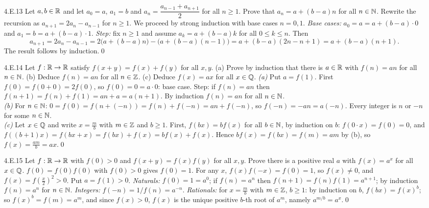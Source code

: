 \begin{bookex}[essential]{4.E.13}
Let $a,b\in\mathbb{R}$ and let $a_0=a$, $a_1=b$ and $a_n=\dfrac{a_{n-1}+a_{n+1}}2$ for all $n\ge1$. Prove that $a_n=a+(b-a)n$ for all $n\in\mathbb{N}$.
\solution
Rewrite the recursion as $a_{n+1}=2a_n-a_{n-1}$ for $n\ge1$. We proceed by strong induction with base cases $n=0,1$. \emph{Base cases:} $a_0=a=a+(b-a)\cdot0$ and $a_1=b=a+(b-a)\cdot1$. \emph{Step:} fix $n\ge1$ and assume $a_k=a+(b-a)k$ for all $0\le k\le n$. Then
\[
a_{n+1}=2a_n-a_{n-1}=2\big(a+(b-a)n\big)-\big(a+(b-a)(n-1)\big)=a+(b-a)(2n-n+1)=a+(b-a)(n+1).
\]
The result follows by induction.\qed
\end{bookex}

\begin{bookex}[recommended]{4.E.14}
Let $f:\mathbb{R}\to\mathbb{R}$ satisfy $f(x+y)=f(x)+f(y)$ for all $x,y$. (a) Prove by induction that there is $a\in\mathbb{R}$ with $f(n)=an$ for all $n\in\mathbb{N}$. (b) Deduce $f(n)=an$ for all $n\in\mathbb{Z}$. (c) Deduce $f(x)=ax$ for all $x\in\mathbb{Q}$.
\solution
\emph{(a)} Put $a=f(1)$. First $f(0)=f(0+0)=2f(0)$, so $f(0)=0=a\cdot0$: base case. Step: if $f(n)=an$ then $f(n+1)=f(n)+f(1)=an+a=a(n+1)$. By induction $f(n)=an$ for all $n\in\mathbb{N}$.\\
\emph{(b)} For $n\in\mathbb{N}$: $0=f(0)=f(n+(-n))=f(n)+f(-n)=an+f(-n)$, so $f(-n)=-an=a(-n)$. Every integer is $n$ or $-n$ for some $n\in\mathbb{N}$.\\
\emph{(c)} Let $x\in\mathbb{Q}$ and write $x=\frac mb$ with $m\in\mathbb{Z}$ and $b\ge1$. First, $f(bx)=bf(x)$ for all $b\in\mathbb{N}$, by induction on $b$: $f(0\cdot x)=f(0)=0$, and $f((b+1)x)=f(bx+x)=f(bx)+f(x)=bf(x)+f(x)$. Hence $bf(x)=f(bx)=f(m)=am$ by (b), so $f(x)=\frac{am}b=ax$.\qed
\end{bookex}

\begin{bookex}[recommended]{4.E.15}
Let $f:\mathbb{R}\to\mathbb{R}$ with $f(0)>0$ and $f(x+y)=f(x)f(y)$ for all $x,y$. Prove there is a positive real $a$ with $f(x)=a^x$ for all $x\in\mathbb{Q}$.
\solution
$f(0)=f(0)f(0)$ with $f(0)>0$ gives $f(0)=1$. For any $x$, $f(x)f(-x)=f(0)=1$, so $f(x)\ne0$, and $f(x)=f(\frac x2)^2>0$. Put $a=f(1)>0$. \emph{Naturals:} $f(0)=1=a^0$; if $f(n)=a^n$ then $f(n+1)=f(n)f(1)=a^{n+1}$; by induction $f(n)=a^n$ for $n\in\mathbb{N}$. \emph{Integers:} $f(-n)=1/f(n)=a^{-n}$. \emph{Rationals:} for $x=\frac mb$ with $m\in\mathbb{Z}$, $b\ge1$: by induction on $b$, $f(bx)=f(x)^b$; so $f(x)^b=f(m)=a^m$, and since $f(x)>0$, $f(x)$ is the unique positive $b$-th root of $a^m$, namely $a^{m/b}=a^x$.\qed
\end{bookex}

